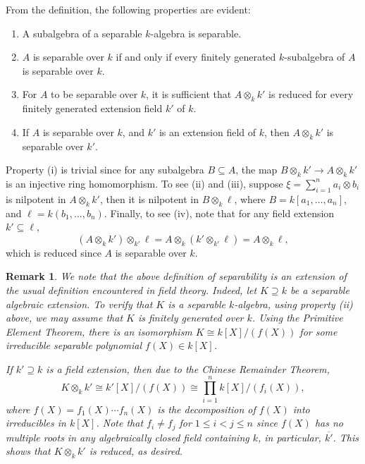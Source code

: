 \documentclass[10pt]{article}
\theoremstyle{thmstyle}
\theoremstyle{defstyle}
\newtheorem{remark}[theorem]{Remark}
\renewcommand{\le}{\leqslant}
\begin{document}
From the definition, the following properties are evident: 
\begin{enumerate}[label=(\roman*)]
    \item A subalgebra of a separable $k$-algebra is separable. 
    \item $A$ is separable over $k$ if and only if every finitely generated $k$-subalgebra of $A$ is separable over $k$. 
    \item For $A$ to be separable over $k$, it is sufficient that $A\otimes_k k'$ is reduced for every finitely generated extension field $k'$ of $k$.
    \item If $A$ is separable over $k$, and $k'$ is an extension field of $k$, then $A\otimes_k k'$ is separable over $k'$.
\end{enumerate}

Property (i) is trivial since for any subalgebra $B\subseteq A$, the map $B\otimes_k k'\to A\otimes_k k'$ is an injective ring homomorphism. To see (ii) and (iii), suppose $\xi = \sum_{i = 1}^n a_i\otimes b_i$ is nilpotent in $A\otimes_k k'$, then it is nilpotent in $B\otimes_k \ell$, where $B = k[a_1,\dots, a_n]$, and $\ell = k(b_1,\dots, b_n)$. Finally, to see (iv), note that for any field extension $k'\subseteq\ell$, 
\begin{equation*}
    \left(A\otimes_k k'\right)\otimes_{k'}\ell =  A\otimes_k\left(k'\otimes_{k'}\ell\right) = A\otimes_k \ell,
\end{equation*}
which is reduced since $A$ is separable over $k$.

\begin{remark}
    We note that the above definition of separability is an extension of the usual definition encountered in field theory. Indeed, let $K\supseteq k$ be a separable algebraic extension. To verify that $K$ is a separable $k$-algebra, using property (ii) above, we may assume that $K$ is finitely generated over $k$. Using the Primitive Element Theorem, there is an isomorphism $K\cong k[X]/(f(X))$ for some irreducible separable polynomial $f(X)\in k[X]$. 

    If $k'\supseteq k$ is a field extension, then due to the Chinese Remainder Theorem,
    \begin{equation*}
        K\otimes_k k'\cong k'[X]/(f(X))\cong\prod_{i = 1}^n k[X]/(f_i(X)),
    \end{equation*}
    where $f(X) = f_1(X)\cdots f_n(X)$ is the decomposition of $f(X)$ into irreducibles in $k[X]$. Note that $f_i\ne f_j$ for $1\le i < j\le n$ since $f(X)$ has no multiple roots in any algebraically closed field containing $k$, in particular, $\overline{k'}$. This shows that $K\otimes_k k'$ is reduced, as desired.
\end{remark}
\end{document}
